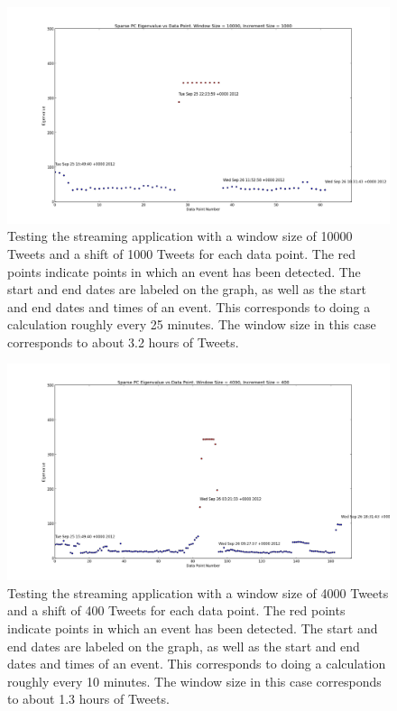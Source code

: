\documentclass[11pt,a4paper]{article}
\begin{document}
\begin{figure}[H]
\centering
\includegraphics[scale=0.25]{Testing_Streaming_App_10000_1000.png}
\caption{Testing the streaming application with a window size of 10000 Tweets and a shift of 1000 Tweets for each data point. The red points indicate points in which an event has been detected. The start and end dates are labeled on the graph, as well as the start and end dates and times of an event. This corresponds to doing a calculation roughly every  25 minutes. The window size in this case corresponds to about 3.2 hours of Tweets.}
\label{testing_app_10000}
\end{figure}

\begin{figure}[H]
\centering
\includegraphics[scale=0.25]{Testing_Streaming_App_4000_400.png}
\caption{Testing the streaming application with a window size of 4000 Tweets and a shift of 400 Tweets for each data point. The red points indicate points in which an event has been detected. The start and end dates are labeled on the graph, as well as the start and end dates and times of an event. This corresponds to doing a calculation roughly every  10 minutes. The window size in this case corresponds to about 1.3 hours of Tweets.}
\label{testing_app_4000}
\end{figure}
\end{document}

